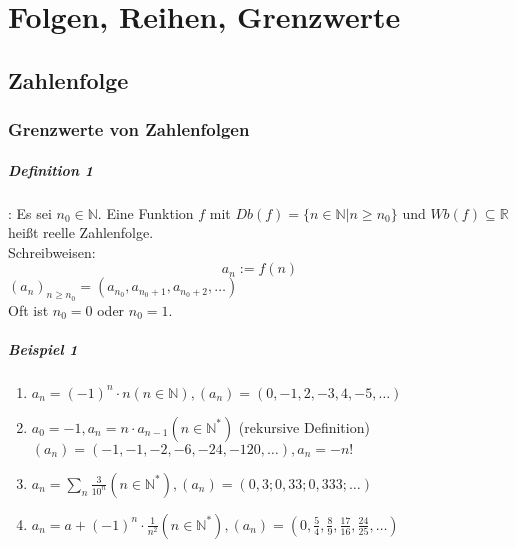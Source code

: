 \documentclass[a4paper]{scrartcl}
\begin{document}
\section{Folgen, Reihen, Grenzwerte}
\subsection{Zahlenfolge}
\subsubsection{Grenzwerte von Zahlenfolgen}
\subparagraph{Definition 1}: Es sei $n_0 \in \mathbb{N}$. Eine Funktion $f$ mit $Db(f) = \{ n \in \mathbb{N} | n \geq n_0 \} \text{ und } Wb(f) \subseteq \mathbb{R}$ heißt reelle Zahlenfolge.\\
Schreibweisen: \[a_n := f(n)\]
$(a_n)_{n\geq n_0} = (a_{n_0}, a_{n_0 +1 }, a_{n_0 +2 },\dots)$\\
Oft ist $n_0 = 0$ oder $ n_0=1$.

\subparagraph{Beispiel 1}
\begin{enumerate}
\item $a_n = (-1)^n \cdot n (n \in \mathbb{N}), (a_n) = (0,-1,2,-3,4,-5,\dots)$
\item $a_0 = -1, a_n = n \cdot a_{n-1} ( n \in \mathbb{N}^*)$ (rekursive Definition)\\
$(a_n)= (-1,-1,-2,-6,-24,-120,\dots), a_n= -n!$
\item $a_n= \sum\limits_n \frac{3}{10^n} (n\in\mathbb{N}^*), (a_n) = (0,3;0,33;0,333;\dots)$
\item $a_n = a + (-1)^n \cdot \frac{1}{n^2} (n \in \mathbb{N}^*), (a_n) = (0,\frac{5}{4},\frac{8}{9},\frac{17}{16},\frac{24}{25},\dots)$
\end{enumerate}
\end{document}
